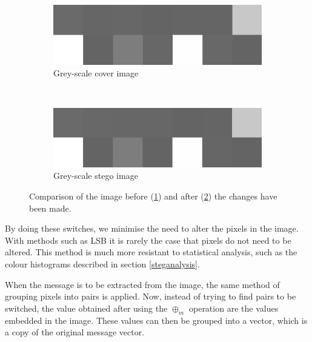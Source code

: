\begin{figure}[h!]
    \centering
    \begin{subfigure}[b]{0.45\textwidth}
        \includegraphics[width=\textwidth, frame]{figures/pixelgrid.png}
		\caption{Grey-scale cover image}
		\label{fig:startingImageComp}
    \end{subfigure}
    ~ %
    \begin{subfigure}[b]{0.45\textwidth}
        \includegraphics[width=\textwidth, frame]{figures/pixelgrid2.png}
		\caption{Grey-scale stego image}
		\label{fig:endingImageComp}
    \end{subfigure}
    \caption{Comparison of the image before (\ref{fig:startingImageComp}) and after (\ref{fig:endingImageComp}) the changes have been made.}\label{fig:pixelGrids}
\end{figure}

By doing these switches, we minimise the need to alter the pixels in the image.
With methods such as LSB it is rarely the case that pixels do not need to be altered.
This method is much more resistant to statistical analysis, such as the colour histograms described in section \ref{steganalysis}.

When the message is to be extracted from the image, the same method of grouping pixels into pairs is applied.
Now, instead of trying to find pairs to be switched, the value obtained after using the $\oplus_m$ operation are the values embedded in the image.
These values can then be grouped into a vector, which is a copy of the original message vector.
